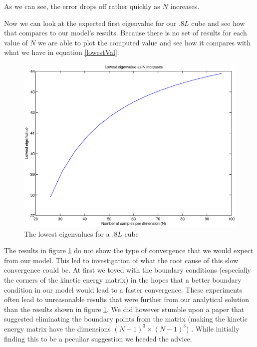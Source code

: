 \documentclass[authoryearcitations]{UoYCSproject}
\begin{document}
As we can see, the error drops off rather quickly as $N$ increases. 

Now we can look at the expected first eigenvalue
for our $.8L$ cube and see how that compares to our model's results. 
Because there is no set of results for each value of $N$ we are able
to plot the computed value and see how it compares with what we have in equation \ref{lowestVal}.

\begin{figure}[!h]
\centering
\includegraphics[scale=0.4]{figures/Mconverge.eps}
\caption{The lowest eigenvalues for a $.8L$ cube} 
\label{MconvergePlot}
\end{figure}

The results in figure \ref{MconvergePlot} do not show the type of convergence that we would expect from 
our model. This led to investigation of what the root cause of this slow convergence could be. At first
we toyed with the boundary conditions (especially the corners of the kinetic energy matrix) in the hopes
that a better boundary condition in our model would lead to a faster convergence. These experiments often lead to
unreasonable results that were further from our analytical solution than the results shown in figure \ref{MconvergePlot}.
We did however stumble upon a paper that suggested eliminating the boundary points from the matrix (making the kinetic
energy matrix have the dimensions $(N-1)^3 \times (N-1)^3$) \cite{datta}. While initially finding this to be a peculiar 
suggestion we heeded the advice.
\end{document}
